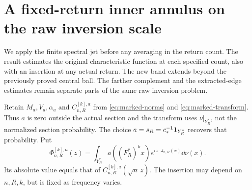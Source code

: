 \section{A fixed-return inner annulus on the raw inversion scale}
\label{sec:fixed-return-annulus}
We apply the finite spectral jet before any averaging in the return
count. The result estimates the original characteristic function at
each specified count, also with an insertion at any actual return.
The new band extends beyond the previously proved central ball.
The farther complement and the extracted-edge estimates remain
separate parts of the same raw inversion problem.

Retain $M_a,V_a,\alpha_a$ and $C^{[k],a}_{n,R}$ from
\eqref{eq:marked-norms} and \eqref{eq:marked-transform}. Thus $a$ is
zero outside the actual section and the transform uses
$\nu|_{Y_R^*}$, not the normalized section probability.
The choice $a=s_R=c_*^{-1}\mathbf1_{Y_R^*}$ recovers that probability.
Put
\[
 \Phi^{[k],a}_{n,R}(z)=\int_{Y_R^*}a((F_R^*)^kx)e^{iz\cdot J_{n,R}(x)}\dd\nu(x).
\]
Its absolute value equals that of $C^{[k],a}_{n,R}(\sqrt n\,z)$.
The insertion may depend on $n,R,k$, but is fixed as frequency varies.

